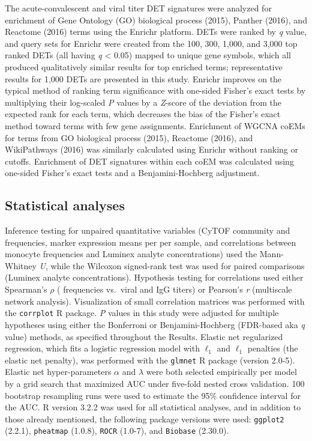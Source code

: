 The acute-convalescent and viral titer DET signatures were analyzed for enrichment of Gene Ontology (GO) biological process\autocite{GOC2015} (2015), Panther\autocite{Mi2013} (2016), and Reactome\autocite{Fabregat2016} (2016) terms using the Enrichr platform.\autocite{Chen2013} DETs were ranked by \emph{q} value, and query sets for Enrichr were created from the 100, 300, 1,000, and 3,000 top ranked DETs (all having \emph{q} < 0.05) mapped to unique gene symbols, which all produced qualitatively similar results for top enriched terms; representative results for 1,000 DETs are presented in this study. Enrichr improves on the typical method of ranking term significance with one-sided Fisher’s exact tests by multiplying their log-scaled \emph{P} values by a \emph{Z}-score of the deviation from the expected rank for each term, which decreases the bias of the Fisher’s exact method toward terms with few gene assignments.\autocite{Chen2013} Enrichment of WGCNA coEMs for terms from GO biological process (2015), Reactome (2016), and WikiPathways\autocite{Kutmon2016} (2016) was similarly calculated using Enrichr without ranking or cutoffs. Enrichment of DET signatures within each coEM was calculated using one-sided Fisher’s exact tests and a Benjamini-Hochberg adjustment.

\subsection{Statistical analyses}

Inference testing for unpaired quantitative variables (CyTOF community and \subcommunity{} frequencies, marker expression means per \subcommunity{} per sample, and correlations between monocyte \subcommunity{} frequencies and Luminex analyte concentrations) used the Mann-Whitney \emph{U}, while the Wilcoxon signed-rank test was used for paired comparisons (Luminex analyte concentrations). Hypothesis testing for correlations used either Spearman's $\rho$ (\subcommunity{} frequencies vs.\ viral and IgG titers) or Pearson’s \emph{r} (multiscale network analysis). Visualization of small correlation matrices was performed with the \texttt{corrplot} R package. \emph{P} values in this study were adjusted for multiple hypotheses using either the Bonferroni or Benjamini-Hochberg (FDR-based aka \emph{q} value) methods, as specified throughout the Results. Elastic net regularized regression, which fits a logistic regression model with $\ell_1$ and $\ell_1$ penalties (the elastic net penalty), was performed with the \texttt{glmnet}\autocite{Friedman2010} R package (version 2.0-5). Elastic net hyper-parameters $\alpha$ and $\lambda$ were both selected empirically per model by a grid search that maximized AUC under five-fold nested cross validation. 100 bootstrap resampling runs were used to estimate the 95\% confidence interval for the AUC. R version 3.2.2 was used for all statistical analyses, and in addition to those already mentioned, the following package versions were used: \texttt{ggplot2} (2.2.1), \texttt{pheatmap} (1.0.8), \texttt{ROCR}\autocite{Sing2005} (1.0-7), and \texttt{Biobase} (2.30.0).

